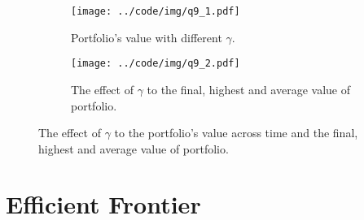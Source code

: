 \documentclass[runningheads]{llncs}
\begin{document}
\begin{figure}[!htbp]
    \begin{subfigure}[t]{0.49\textwidth}
        \centering
        \texttt{[image: ../code/img/q9\_1.pdf]}
        \caption{Portfolio's value with different $\gamma$.}
    \end{subfigure}
    \begin{subfigure}[t]{0.49\textwidth}
        \centering
        \texttt{[image: ../code/img/q9\_2.pdf]}
        \caption{The effect of $\gamma$ to the final, highest and average value of portfolio.}
    \end{subfigure}
    \caption{ The effect of $\gamma$ to the portfolio's value across time and the final, highest and average value of portfolio.}
    \label{fig:q9}
\end{figure}


\section{Efficient Frontier}\label{sec:10}



\end{document}
